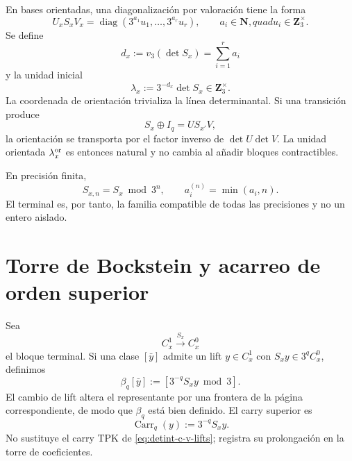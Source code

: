 En bases orientadas, una diagonalización por valoración tiene la forma
\begin{equation}\label{eq:detint-smith}
 U_xS_xV_x
 =\operatorname{diag}(3^{a_1}u_1,\ldots,3^{a_r}u_r),
 \qquad
 a_i\in\mathbf N,quad u_i\in\mathbf Z_3^\times.
\end{equation}
Se define
\begin{equation}\label{eq:detint-orden-d}
 d_x:=v_3(\det S_x)=\sum_{i=1}^r a_i
\end{equation}
y la unidad inicial
\begin{equation}\label{eq:detint-leading-unit}
 \lambda_x:=3^{-d_x}\det S_x\in\mathbf Z_3^\times.
\end{equation}
La coordenada de orientación trivializa la línea determinantal. Si una
transición produce
\begin{equation}\label{eq:detint-estabilidad-bloques}
 S_x\oplus I_q=U S_{x'}V,
\end{equation}
la orientación se transporta por el factor inverso de \(\det U\det V\).
La unidad orientada \(\lambda_x^{\rm or}\) es entonces natural y no cambia
al añadir bloques contractibles.

En precisión finita,
\begin{equation}\label{eq:detint-smith-finito}
 S_{x,n}=S_x\bmod3^n,
 \qquad
 a_i^{(n)}=\min(a_i,n).
\end{equation}
El terminal es, por tanto, la familia compatible de todas las precisiones y
no un entero aislado.

\section{Torre de Bockstein y acarreo de orden superior}

Sea
\[
 C_x^1\xrightarrow{S_x}C_x^0
\]
el bloque terminal. Si una clase \([\bar y]\) admite un lift
\(y\in C_x^1\) con \(S_xy\in3^qC_x^0\), definimos
\begin{equation}\label{eq:detint-beta-q}
 \beta_q[\bar y]
 :=\left[3^{-q}S_xy\bmod3\right].
\end{equation}
El cambio de lift altera el representante por una frontera de la página
correspondiente, de modo que \(\beta_q\) está bien definido. El carry
superior es
\begin{equation}\label{eq:detint-carry-superior}
 \operatorname{Carr}_q(y):=3^{-q}S_xy.
\end{equation}
No sustituye el carry TPK de \eqref{eq:detint-c-v-lifts}; registra su
prolongación en la torre de coeficientes.

